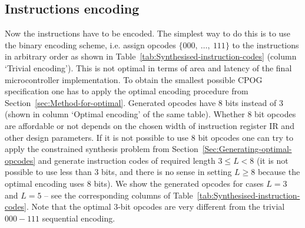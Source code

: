 \subsection{Instructions encoding}

Now the instructions have to be encoded. The simplest way to do this
is to use the binary encoding scheme, i.e. assign opcodes $\{000,\ \dots,\ 111\}$
to the instructions in arbitrary order as shown in Table~\ref{tab:Synthesised-instruction-codes}
(column `Trivial encoding'). This is not optimal in terms of area
and latency of the final microcontroller implementation. To obtain
the smallest possible CPOG specification one has to apply the optimal
encoding procedure from Section~\ref{sec:Method-for-optimal}. Generated
opcodes have 8 bits instead of 3 (shown in column `Optimal encoding'
of the same table). Whether 8 bit opcodes are affordable or not depends
on the chosen width of instruction register IR and other design parameters.
If it is not possible to use 8 bit opcodes one can try to apply the
constrained synthesis problem from Section~\ref{Sec:Generating-optimal-opcodes}
and generate instruction codes of required length $3\le L<8$ (it
is not possible to use less than 3 bits, and there is no sense in
setting $L\ge8$ because the optimal encoding uses 8 bits). We show
the generated opcodes for cases $L=3$ and $L=5$ -- see the corresponding
columns of Table~\ref{tab:Synthesised-instruction-codes}. Note that
the optimal 3-bit opcodes are very different from the trivial $000-111$
sequential encoding.

